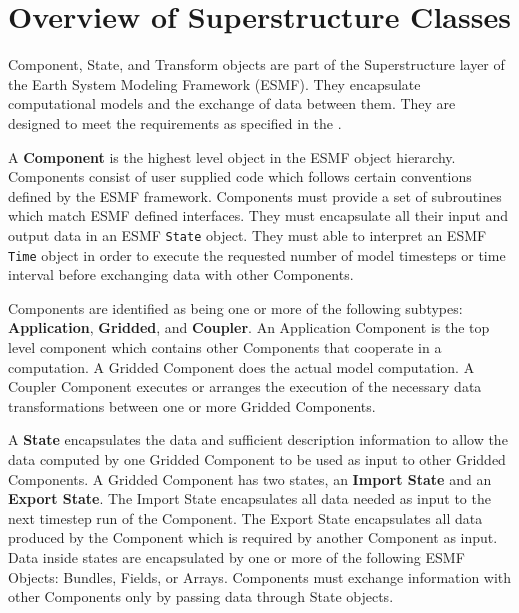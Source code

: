 %

\section{Overview of Superstructure Classes}

Component, State, and Transform objects are part of the Superstructure 
layer of the Earth System Modeling Framework (ESMF).  They encapsulate
computational models and the exchange of data between them.
They are designed to meet the requirements as specified in the
.

A {\bf Component} 
is the highest level object in the ESMF object
hierarchy.  Components consist of user supplied code
which follows certain conventions defined by the ESMF framework. 
Components must provide a set of subroutines which match ESMF
defined interfaces. They must encapsulate
all their input and output data in an ESMF {\tt State} object.  They
must able to interpret an ESMF {\tt Time} object in order
to execute the requested number of model timesteps or time interval
before exchanging data with other Components.

Components are identified as being one or more of the
following subtypes: {\bf Application}, {\bf Gridded}, and {\bf Coupler}.  
An Application Component is the top level component which
contains other Components that cooperate in a computation. 
A Gridded Component
does the actual model computation.  A Coupler Component executes or
arranges the execution of the necessary data transformations between one
or more Gridded Components.


A {\bf State} 
encapsulates the data and sufficient description information
to allow the data computed by one Gridded Component to be
used as input to other Gridded Components.  A Gridded Component has
two states, an {\bf Import State} and an {\bf Export State}.
The Import State encapsulates all data needed as input to the
next timestep run of the Component.  The Export State encapsulates 
all data produced by the Component which is required by another
Component as input.  Data inside states are encapsulated by one 
or more of the following ESMF Objects: Bundles, Fields, or Arrays.
Components must exchange information with other Components
only by passing data through State objects.

